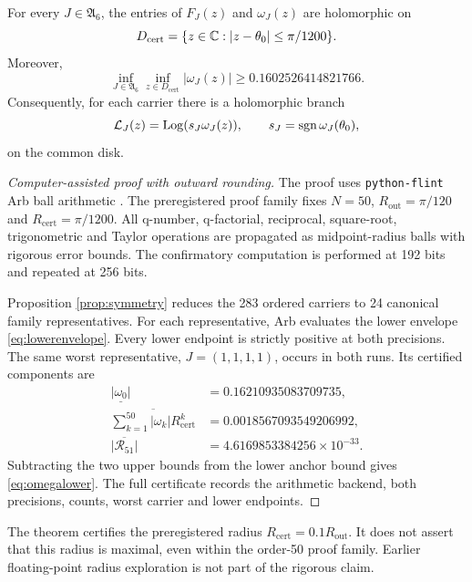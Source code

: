 \begin{theorem}
\label{thm:conditioning}
For every $J\in\mathfrak A_6$, the entries of $F_J(z)$ and $\omega_J(z)$ are holomorphic on
\[
D_{\mathrm{cert}}=\{z\in\mathbb C:|z-\theta_0|\le\pi/1200\}.
\]
Moreover,
\begin{equation}
\inf_{J\in\mathfrak A_6}
\inf_{z\in D_{\mathrm{cert}}}
|\omega_J(z)|
\ge0.1602526414821766.
\label{eq:omegalower}
\end{equation}
Consequently, for each carrier there is a holomorphic branch
\begin{equation}
\mathcal L_J(z)=\operatorname{Log}(s_J\omega_J(z)),
\qquad s_J=\operatorname{sgn}\omega_J(\theta_0),
\end{equation}
on the common disk.
\end{theorem}

\begin{proof}[Computer-assisted proof with outward rounding]
The proof uses \texttt{python-flint} Arb ball arithmetic \cite{johansson2017arb}.  The preregistered proof family fixes $N=50$, $R_{\mathrm{out}}=\pi/120$ and $R_{\mathrm{cert}}=\pi/1200$.  All q-number, q-factorial, reciprocal, square-root, trigonometric and Taylor operations are propagated as midpoint-radius balls with rigorous error bounds.  The confirmatory computation is performed at 192 bits and repeated at 256 bits.

Proposition \ref{prop:symmetry} reduces the 283 ordered carriers to 24 canonical family representatives.  For each representative, Arb evaluates the lower envelope \eqref{eq:lowerenvelope}.  Every lower endpoint is strictly positive at both precisions.  The same worst representative, $J=(1,1,1,1)$, occurs in both runs.  Its certified components are
\begin{align}
\underline{|\omega_0|}&=0.16210935083709735,\\
\overline{\sum_{k=1}^{50}|\omega_k|R_{\mathrm{cert}}^k}
&=0.0018567093549206992,\\
\overline{|\mathcal R_{51}|}
&=4.6169853384256\times10^{-33}.
\end{align}
Subtracting the two upper bounds from the lower anchor bound gives \eqref{eq:omegalower}.  The full certificate records the arithmetic backend, both precisions, counts, worst carrier and lower endpoints.
\end{proof}

\begin{remark}
The theorem certifies the preregistered radius $R_{\mathrm{cert}}=0.1R_{\mathrm{out}}$.  It does not assert that this radius is maximal, even within the order-50 proof family.  Earlier floating-point radius exploration is not part of the rigorous claim.
\end{remark}

